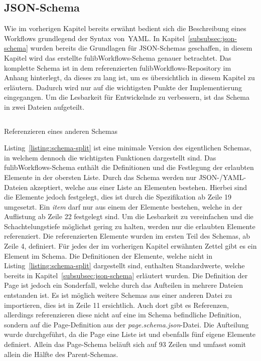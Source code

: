 \subsection{JSON-Schema}\label{subsec:schema}
Wie im vorherigen Kapitel bereits erwähnt bedient sich die Beschreibung eines Workflows grundlegend der Syntax von~\ac{YAML}.
In Kapitel~\ref{subsubsec:json-schema} wurden bereits die Grundlagen für JSON-Schemas geschaffen, in diesem Kapitel wird das erstellte
fulibWorkflows-Schema genauer betrachtet.
Das komplette Schema ist in dem referenzierten fulibWorkflows-Repository im Anhang hinterlegt, da dieses zu lang ist, um es übersichtlich in diesem Kapitel zu erläutern.
Dadurch wird nur auf die wichtigsten Punkte der Implementierung eingegangen.
Um die Lesbarkeit für Entwickelnde zu verbessern, ist das Schema in zwei Dateien aufgeteilt.

\begin{listing}[!ht]
    \inputminted{json}{listings/3.1.2/page.json}
    \caption{Referenzieren eines anderen Schemas}
    \label{listing:schema-split}
\end{listing}

Listing~\ref{listing:schema-split} ist eine minimale Version des eigentlichen Schemas, in welchem dennoch die wichtigsten Funktionen dargestellt sind.
Das fulibWorkflows-Schema enthält die Definitionen und die Festlegung der erlaubten Elemente in der obersten Liste.
Durch das Schema werden nur JSON-/YAML-Dateien akzeptiert, welche aus einer Liste an Elementen bestehen.
Hierbei sind die Elemente jedoch festgelegt, dies ist durch die Spezifikation ab Zeile 19 umgesetzt.
Ein \textit{item} darf nur aus einem der Elemente bestehen, welche in der Auflistung ab Zeile 22 festgelegt sind.
Um die Lesbarkeit zu vereinfachen und die Schachtelungstiefe möglichst gering zu halten, werden nur die erlaubten Elemente referenziert.
Die referenzierten Elemente wurden im ersten Teil des Schemas, ab Zeile 4, definiert.
Für jedes der im vorherigen Kapitel erwähnten Zettel gibt es ein Element im Schema.
Die Definitionen der Elemente, welche nicht in Listing~\ref{listing:schema-split} dargestellt sind, enthalten Standardwerte, welche bereits in Kapitel~\ref{subsubsec:json-schema} erläutert wurden.
Die Definition der Page ist jedoch ein Sonderfall, welche durch das Aufteilen in mehrere Dateien entstanden ist.
Es ist möglich weitere Schemas aus einer anderen Datei zu importieren, dies ist in Zeile 11 ersichtlich.
Auch dort gibt es Referenzen, allerdings referenzieren diese nicht auf eine im Schema befindliche Definition, sondern auf die Page-Definition aus der \textit{page.schema.json}-Datei.
Die Aufteilung wurde durchgeführt, da die Page eine Liste ist und ebenfalls fünf eigene Elemente definiert.
Allein das Page-Schema beläuft sich auf 93 Zeilen und umfasst somit allein die Hälfte des Parent-Schemas.

